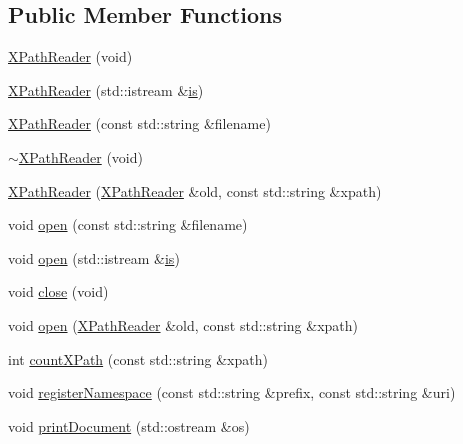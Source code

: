 \subsection*{Public Member Functions}
\begin{DoxyCompactItemize}
\item 
\mbox{\hyperlink{classXMLXPathReader_1_1XPathReader_a0f0a3151a7ee18a11d031841dd1aceca}{X\+Path\+Reader}} (void)
\item 
\mbox{\hyperlink{classXMLXPathReader_1_1XPathReader_a3bf8625a1ef55ff3e3f5ffe3afcd27d1}{X\+Path\+Reader}} (std\+::istream \&\mbox{\hyperlink{x_8cc_a81abbbdef81e25584a2eab888e643d3d}{is}})
\item 
\mbox{\hyperlink{classXMLXPathReader_1_1XPathReader_aede8e4b7ed9f4e396b4c6ee1a1e5b846}{X\+Path\+Reader}} (const std\+::string \&filename)
\item 
\mbox{\hyperlink{classXMLXPathReader_1_1XPathReader_aedd43e5673d660cb93b8158166572521}{$\sim$\+X\+Path\+Reader}} (void)
\item 
\mbox{\hyperlink{classXMLXPathReader_1_1XPathReader_ae37728d823bbf1b7f4c09e3f474df32b}{X\+Path\+Reader}} (\mbox{\hyperlink{classXMLXPathReader_1_1XPathReader}{X\+Path\+Reader}} \&old, const std\+::string \&xpath)
\item 
void \mbox{\hyperlink{classXMLXPathReader_1_1XPathReader_aa6e237582bcd20389d60cb29a879890c}{open}} (const std\+::string \&filename)
\item 
void \mbox{\hyperlink{classXMLXPathReader_1_1XPathReader_aa9a57010ee8e71ac43da4388d622fe32}{open}} (std\+::istream \&\mbox{\hyperlink{x_8cc_a81abbbdef81e25584a2eab888e643d3d}{is}})
\item 
void \mbox{\hyperlink{classXMLXPathReader_1_1XPathReader_a2b6cfab8c9771da838a2bca6c9f23cb9}{close}} (void)
\item 
void \mbox{\hyperlink{classXMLXPathReader_1_1XPathReader_a55e38b40f720bb3622e3489561b1457c}{open}} (\mbox{\hyperlink{classXMLXPathReader_1_1XPathReader}{X\+Path\+Reader}} \&old, const std\+::string \&xpath)
\item 
int \mbox{\hyperlink{classXMLXPathReader_1_1XPathReader_a9fd76703ea5321a4666ca9a0c07a222a}{count\+X\+Path}} (const std\+::string \&xpath)
\item 
void \mbox{\hyperlink{classXMLXPathReader_1_1XPathReader_a4df21ae718977be11eb5669002522ebb}{register\+Namespace}} (const std\+::string \&prefix, const std\+::string \&uri)
\item 
void \mbox{\hyperlink{classXMLXPathReader_1_1XPathReader_a5505bd1ad902828907e2562947719fef}{print\+Document}} (std\+::ostream \&os)

\end{DoxyCompactItemize}
